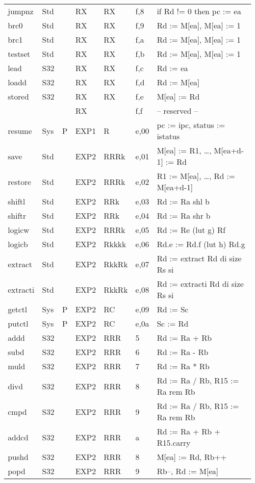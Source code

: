 \documentclass[11pt]{article}
\begin{document}
\begin{center}
\begin{tabular}{lllllll}
jumpnz & Std &  & RX & RX & f,8 & if Rd != 0 then pc := ea\\
brc0 & Std &  & RX & RX & f,9 & Rd := M[ea], M[ea] := 1\\
brc1 & Std &  & RX & RX & f,a & Rd := M[ea], M[ea] := 1\\
testset & Std &  & RX & RX & f,b & Rd := M[ea], M[ea] := 1\\
lead & S32 &  & RX & RX & f,c & Rd := ea\\
loadd & S32 &  & RX & RX & f,d & Rd := M[ea]\\
stored & S32 &  & RX & RX & f,e & M[ea] := Rd\\
 &  &  & RX &  & f,f & -- reserved --\\
\hline
resume & Sys & P & EXP1 & R & e,00 & pc := ipc, status := istatus\\
\hline
save & Std &  & EXP2 & RRRk & e,01 & M[ea] := R1, \ldots{}, M[ea+d-1] := Rd\\
restore & Std &  & EXP2 & RRRk & e,02 & R1 := M[ea], \ldots{}, Rd := M[ea+d-1]\\
shiftl & Std &  & EXP2 & RRk & e,03 & Rd := Ra shl b\\
shiftr & Std &  & EXP2 & RRk & e,04 & Rd := Ra shr b\\
logicw & Std &  & EXP2 & RRRk & e,05 & Rd := Re (lut g) Rf\\
logicb & Std &  & EXP2 & Rkkkk & e,06 & Rd.e := Rd.f (lut h) Rd.g\\
extract & Std &  & EXP2 & RkkRk & e,07 & Rd := extract Rd di size Rs si\\
extracti & Std &  & EXP2 & RkkRk & e,08 & Rd := extracti Rd di size Rs si\\
getctl & Sys & P & EXP2 & RC & e,09 & Rd := Sc\\
putctl & Sys & P & EXP2 & RC & e,0a & Sc := Rd\\
addd & S32 &  & EXP2 & RRR & 5 & Rd := Ra + Rb\\
subd & S32 &  & EXP2 & RRR & 6 & Rd := Ra - Rb\\
muld & S32 &  & EXP2 & RRR & 7 & Rd := Ra * Rb\\
divd & S32 &  & EXP2 & RRR & 8 & Rd := Ra / Rb, R15 := Ra rem Rb\\
cmpd & S32 &  & EXP2 & RRR & 9 & Rd := Ra / Rb, R15 := Ra rem Rb\\
addcd & S32 &  & EXP2 & RRR & a & Rd := Ra + Rb + R15.carry\\
pushd & S32 &  & EXP2 & RRR & 8 & M[ea] := Rd, Rb++\\
popd & S32 &  & EXP2 & RRR & 9 & Rb--, Rd := M[ea]\\

\end{tabular}
\end{center}
\end{document}
